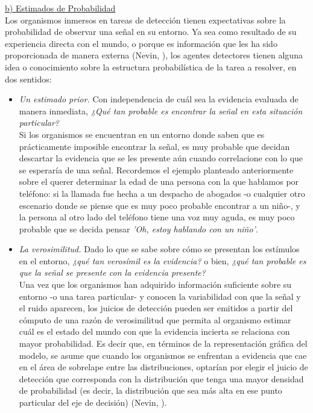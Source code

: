       \underline{b) Estimados de Probabilidad}\\

Los organismos inmersos en tareas de detección tienen expectativas sobre la probabilidad de observar una señal en su entorno. Ya sea como resultado de su experiencia directa con el mundo, o porque es información que les ha sido proporcionada de manera externa (Nevin, \citeyear{Nevin1969}), los agentes detectores tienen alguna idea o conocimiento sobre la estructura probabilística de la tarea a resolver, en dos sentidos: 

\begin{itemize}
\item \textsl{Un estimado prior.} Con independencia de cuál sea la evidencia evaluada de manera inmediata, \textit{¿Qué tan probable es encontrar la señal en esta situación particular?}\\

Si los organismos se encuentran en un entorno donde saben que es prácticamente imposible encontrar la señal, es muy probable que decidan descartar la evidencia que se les presente aún cuando correlacione con lo que se esperaría de una señal. Recordemos el ejemplo planteado anteriormente sobre el querer determinar la edad de una persona con la que hablamos por teléfono: si la llamada fue hecha a un despacho de abogados -o cualquier otro escenario donde se piense que es muy poco probable encontrar a un niño-, y la persona al otro lado del teléfono tiene una voz muy aguda, es muy poco probable que se decida pensar \textit{'Oh, estoy hablando con un niño'}.\\

\item \textsl{La verosimilitud.} Dado lo que se sabe sobre cómo se presentan los estímulos en el entorno, \textit{¿qué tan verosímil es la evidencia?} o bien, \textit{¿qué tan probable es que la señal se presente con la evidencia presente?}\\

Una vez que los organismos han adquirido información suficiente sobre su entorno -o una tarea particular- y conocen la variabilidad con que la señal y el ruido aparecen, los juicios de detección pueden ser emitidos a partir del cómputo de una razón de verosimilitud que permita al organismo estimar cuál es el estado del mundo con que la evidencia incierta se relaciona con mayor probabilidad. Es decir que, en términos de la representación gráfica del modelo, se asume que cuando los organismos se enfrentan a evidencia que cae en el área de sobrelape entre las distribuciones, optarían por elegir el juicio de detección que corresponda con la distribución que tenga una mayor densidad de probabilidad (es decir, la distribución que sea más alta en ese punto particular del eje de decisión) (Nevin, \citeyear{Nevin1969}).\\
\end{itemize}

